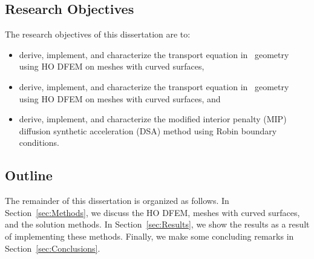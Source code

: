 \documentclass[12pt,letterpaper]{article}
\begin{document}
\subsection{Research Objectives}
\label{sec:ResearchObjectivesIntro}
The research objectives of this dissertation are to:
\begin{itemize}
\item{derive, implement, and characterize the transport equation in \XY\ geometry using HO DFEM on meshes with curved surfaces,}
\item{derive, implement, and characterize the transport equation in \RZ\ geometry using HO DFEM on meshes with curved surfaces, and}
\item{derive, implement, and characterize the modified interior penalty (MIP) diffusion synthetic acceleration (DSA) method using Robin boundary conditions.}
\end{itemize}

\subsection{Outline}
\label{sec:OutlineIntro}
The remainder of this dissertation is organized as follows. In Section~\ref{sec:Methods}, we discuss the HO DFEM, meshes with curved surfaces, and the solution methods. In Section~\ref{sec:Results}, we show the results as a result of implementing these methods. Finally, we make some concluding remarks in Section~\ref{sec:Conclusions}.

%
%
\end{document}
